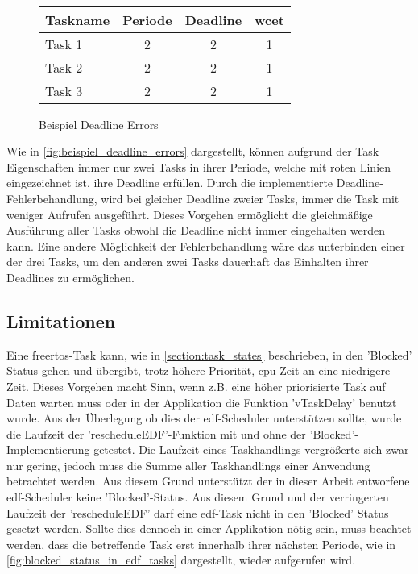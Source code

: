 \documentclass[../EDF Master Thesis.tex]{subfiles}
\begin{document}
\begin{figure}[H]
\begin{tikzpicture}
        \end{tikzpicture}\\
        \vspace {1cm}
        \begin{tabular}{l|c|c|c}
            Taskname & Periode & Deadline & \ac{wcet} \\
            \hline
            Task 1 & 2 & 2 & 1 \\
            Task 2 & 2 & 2 & 1 \\
            Task 3 & 2 & 2 & 1 
        \end{tabular}
        \caption{Beispiel Deadline Errors}
        \label{fig:beispiel_deadline_errors}
    \end{figure}

    Wie in \autoref{fig:beispiel_deadline_errors} dargestellt, können aufgrund der Task Eigenschaften immer nur zwei Tasks in ihrer Periode, welche mit roten Linien eingezeichnet ist, ihre Deadline erfüllen.
    Durch die implementierte Deadline-Fehlerbehandlung, wird bei gleicher Deadline zweier Tasks, immer die Task mit weniger Aufrufen ausgeführt.
    Dieses Vorgehen ermöglicht die gleichmäßige Ausführung aller Tasks obwohl die Deadline nicht immer eingehalten werden kann.
    Eine andere Möglichkeit der Fehlerbehandlung wäre das unterbinden einer der drei Tasks, um den anderen zwei Tasks dauerhaft das Einhalten ihrer Deadlines zu ermöglichen.

\clearpage

\subsection{Limitationen} \label{section:limitationen}

    Eine \ac{freertos}-Task kann, wie in \autoref{section:task_states} beschrieben, in den 'Blocked' Status gehen und übergibt, trotz höhere Priorität, \ac{cpu}-Zeit an eine niedrigere Zeit.
    Dieses Vorgehen macht Sinn, wenn z.B. eine höher priorisierte Task auf Daten warten muss oder in der Applikation die Funktion 'vTaskDelay' benutzt wurde.
    Aus der Überlegung ob dies der \ac{edf}-Scheduler unterstützen sollte, wurde die Laufzeit der 'rescheduleEDF'-Funktion mit und ohne der 'Blocked'-Implementierung getestet.
    Die Laufzeit eines Taskhandlings vergrößerte sich zwar nur gering, jedoch muss die Summe aller Taskhandlings einer Anwendung betrachtet werden.
    Aus diesem Grund unterstützt der in dieser Arbeit entworfene \ac{edf}-Scheduler keine 'Blocked'-Status.
    Aus diesem Grund und der verringerten Laufzeit der 'rescheduleEDF' darf eine \ac{edf}-Task nicht in den 'Blocked' Status gesetzt werden.  
    Sollte dies dennoch in einer Applikation nötig sein, muss beachtet werden, dass die betreffende Task erst innerhalb ihrer nächsten Periode, wie in \autoref{fig:blocked_status_in_edf_tasks} dargestellt, wieder aufgerufen wird.
\end{document}
